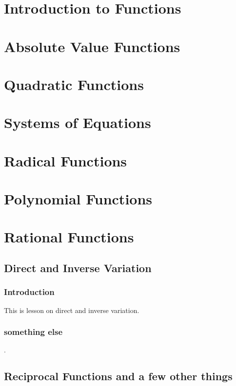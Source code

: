 \documentclass[12pt,letterpaper]{memoir}
\begin{document}
\checkandfixthelayout

\pagestyle{myPagestyle}

\frontmatter
\tableofcontents*

\mainmatter
{} 
\part{Introduction to Functions}
\part{Absolute Value Functions}
\part{Quadratic Functions}
\part{Systems of Equations}

\part{Radical Functions}
\part{Polynomial Functions}
\part{Rational Functions}

\chapter{Direct and Inverse Variation}
\section{Introduction}
This is lesson on direct and inverse variation.

\section{something else}
\Blindtext.

\chapter{Reciprocal Functions and a few other things}
\end{document}
